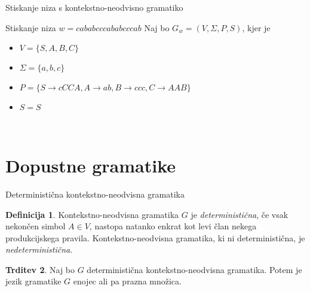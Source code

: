 \documentclass{beamer}
\theoremstyle{definition}
\newtheorem{definicija}{Definicija}[section]
\newtheorem{trditev}[definicija]{Trditev}
\begin{document}
\begin{frame}{Stiskanje niza s kontekstno-neodvisno gramatiko}
    \begin{exampleblock}{Stiskanje niza $ w = \mathit{cababcccababcccab} $}
        Naj bo $ G_w = ( V, \Sigma, P, S ) $, kjer je 
        \begin{itemize}
            \item<2-> $ V = \{ S, A, B, C \} $
            \item<3-> $ \Sigma = \{ a, b, c \} $
            \item<4-> $ P = \{ S  \rightarrow  \mathit{cCCA}, A  \rightarrow  \mathit{ab}, B  
            \rightarrow  \mathit{ccc}, C  \rightarrow  \mathit{AAB} \} $
            \item<5-> $ S = S $
        \end{itemize}
        \pause
        \pause
        \pause
        \pause
        \pause \\
    \end{exampleblock}
\end{frame}

\section{Dopustne gramatike}

\begin{frame}{Deterministična kontekstno-neodvisna gramatika}
    \begin{definicija}
        Kontekstno-neodvisna gramatika $G$ je \textit{deterministična}, če vsak nekončen simbol $ A \in V $,
        nastopa natanko enkrat kot levi član nekega produkcijskega pravila.
        Kontekstno-neodvisna gramatika, ki ni deterministična, je \textit{nedeterministična}.
    \end{definicija}
    \pause
    \begin{trditev}
        Naj bo $G$ deterministična kontekstno-neodvisna gramatika. Potem je jezik gramatike $G$ enojec ali pa prazna množica.
    \end{trditev}
\end{frame}
\end{document}
